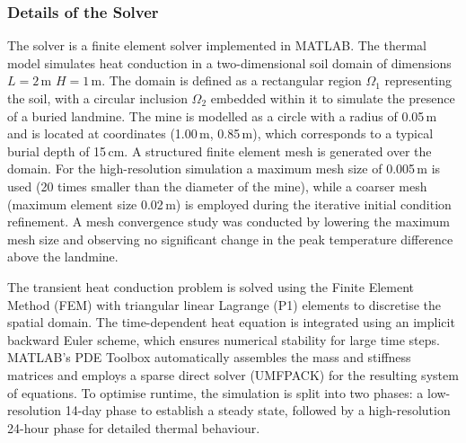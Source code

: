     \subsubsection{Details of the Solver}
    The solver is a finite element solver implemented in MATLAB. The thermal model simulates heat conduction in a two-dimensional soil domain of dimensions $L =2$\,m $H = 1$\,m. The domain is defined as a rectangular region $\Omega_1$ representing the soil, with a circular inclusion $\Omega_2$ embedded within it to simulate the presence of a buried landmine. The mine is modelled as a circle with a radius of 0.05\,m and is located at coordinates (1.00\,m, 0.85\,m), which corresponds to a typical burial depth of 15\,cm. A structured finite element mesh is generated over the domain. For the high-resolution simulation a maximum mesh size of 0.005\,m is used (20 times smaller than the diameter of the mine), while a coarser mesh (maximum element size 0.02\,m) is employed during the iterative initial condition refinement. A mesh convergence study was conducted by lowering the maximum mesh size and observing no significant change in the peak temperature difference above the landmine.
    
    The transient heat conduction problem is solved using the Finite Element Method (FEM) with triangular linear Lagrange (P1) elements to discretise the spatial domain. The time-dependent heat equation is integrated using an implicit backward Euler scheme, which ensures numerical stability for large time steps. MATLAB's PDE Toolbox automatically assembles the mass and stiffness matrices and employs a sparse direct solver (UMFPACK) for the resulting system of equations. To optimise runtime, the simulation is split into two phases: a low-resolution 14-day phase to establish a steady state, followed by a high-resolution 24-hour phase for detailed thermal behaviour.

